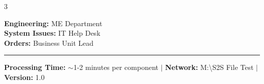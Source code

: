 \documentclass[10pt,landscape]{article}
\begin{document}
\begin{multicols}{3}
\vspace{0.2cm}

\begin{tcolorbox}[colback=green!10,colframe=green!70!black,title=\textbf{Contact}]
\textbf{Engineering:} ME Department\\
\textbf{System Issues:} IT Help Desk\\
\textbf{Orders:} Business Unit Lead
\end{tcolorbox}

\end{multicols}

\vspace{0.3cm}
\hrule
\vspace{0.2cm}
\begin{center}
\textbf{Processing Time:} $\sim$1-2 minutes per component \quad $\vert$ \quad \textbf{Network:} M:\textbackslash S2S File Test \quad $\vert$ \quad \textbf{Version:} 1.0
\end{center}
\end{document}
